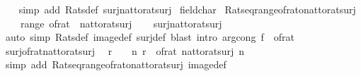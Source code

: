 \begin{isabellebody}
%
\isadelimproof
\ \ %
\endisadelimproof
%
\isatagproof
{}\isamarkupfalse%
\ {\isacharparenleft}simp\ add{\isacharcolon}\ Rats{\isacharunderscore}def\ surj{\isacharunderscore}nat{\isacharunderscore}to{\isacharunderscore}rat{\isacharunderscore}surj{\isacharparenright}%
\endisatagproof
{\isafoldproof}%
%
\isadelimproof
\isanewline
%
\endisadelimproof
\isanewline
{}\isamarkupfalse%
\ field{\isacharunderscore}char{\isacharunderscore}{}\isanewline
{}\isanewline
\isanewline
{}\isamarkupfalse%
\ Rats{\isacharunderscore}eq{\isacharunderscore}range{\isacharunderscore}of{\isacharunderscore}rat{\isacharunderscore}o{\isacharunderscore}nat{\isacharunderscore}to{\isacharunderscore}rat{\isacharunderscore}surj{\isacharcolon}\isanewline
\ \ {\isachardoublequoteopen}{\isasymrat}\ {\isacharequal}\ range\ {\isacharparenleft}of{\isacharunderscore}rat\ {\isasymcirc}\ nat{\isacharunderscore}to{\isacharunderscore}rat{\isacharunderscore}surj{\isacharparenright}{\isachardoublequoteclose}\isanewline
%
\isadelimproof
\ \ %
\endisadelimproof
%
\isatagproof
{}\isamarkupfalse%
\ surj{\isacharunderscore}nat{\isacharunderscore}to{\isacharunderscore}rat{\isacharunderscore}surj\isanewline
\ \ \isamarkupfalse%
\ {\isacharparenleft}auto\ simp{\isacharcolon}\ Rats{\isacharunderscore}def\ image{\isacharunderscore}def\ surj{\isacharunderscore}def{\isacharparenright}\ {\isacharparenleft}blast\ intro{\isacharcolon}\ arg{\isacharunderscore}cong{\isacharbrackleft}\ f\ {\isacharequal}\ of{\isacharunderscore}rat{\isacharbrackright}{\isacharparenright}%
\endisatagproof
{\isafoldproof}%
%
\isadelimproof
\isanewline
%
\endisadelimproof
\isanewline
{}\isamarkupfalse%
\ surj{\isacharunderscore}of{\isacharunderscore}rat{\isacharunderscore}nat{\isacharunderscore}to{\isacharunderscore}rat{\isacharunderscore}surj{\isacharcolon}\isanewline
\ \ {\isachardoublequoteopen}r\ {\isasymin}\ {\isasymrat}\ {\isasymLongrightarrow}\ {\isasymexists}n{\isachardot}\ r\ {\isacharequal}\ of{\isacharunderscore}rat\ {\isacharparenleft}nat{\isacharunderscore}to{\isacharunderscore}rat{\isacharunderscore}surj\ n{\isacharparenright}{\isachardoublequoteclose}\isanewline
%
\isadelimproof
\ \ %
\endisadelimproof
%
\isatagproof
{}\isamarkupfalse%
\ {\isacharparenleft}simp\ add{\isacharcolon}\ Rats{\isacharunderscore}eq{\isacharunderscore}range{\isacharunderscore}of{\isacharunderscore}rat{\isacharunderscore}o{\isacharunderscore}nat{\isacharunderscore}to{\isacharunderscore}rat{\isacharunderscore}surj\ image{\isacharunderscore}def{\isacharparenright}%

\end{isabellebody}
